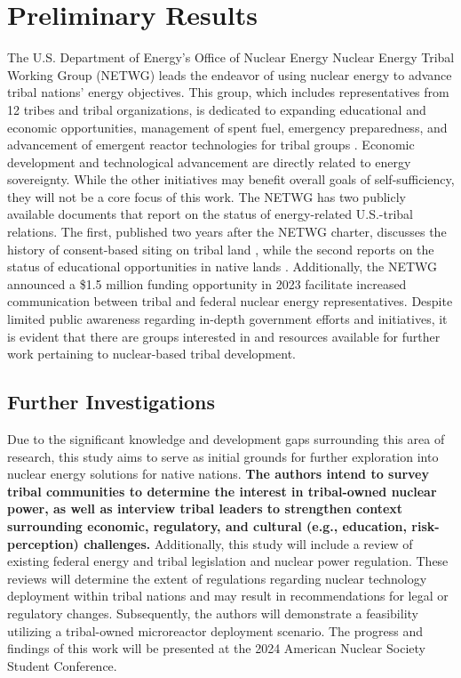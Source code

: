 \documentclass{anstrans}
\begin{document}
\section{Preliminary Results}
The U.S. Department of Energy's Office of Nuclear Energy Nuclear Energy Tribal
Working Group (NETWG) leads the endeavor of using nuclear energy to advance
tribal nations' energy objectives. This group, which includes representatives
from 12 tribes and tribal organizations, is dedicated to expanding educational
and economic opportunities, management of spent fuel, emergency preparedness,
and advancement of emergent reactor technologies for tribal groups
\cite{department_of_energy_nuclear_2023}. Economic development and technological
advancement are directly related to energy sovereignty. While the other
initiatives may benefit overall goals of self-sufficiency, they will not be a
core focus of this work. The NETWG has two publicly available documents that
report on the status of energy-related U.S.-tribal relations. The first,
published two years after the NETWG charter, discusses the history of
consent-based siting on tribal land
\cite{nuclear_energy_tribal_working_group_2016}, while the second reports on the
status of educational opportunities in native lands
\cite{nuclear_energy_tribal_working_group_2016}. Additionally, the NETWG
announced a \$1.5 million funding opportunity in 2023 facilitate increased
communication between tribal and federal nuclear energy representatives. Despite
limited public awareness regarding in-depth government efforts and initiatives,
it is evident that there are groups interested in and resources available for
further work pertaining to nuclear-based tribal development.

\subsection{Further Investigations}
Due to the significant knowledge and development gaps surrounding this area of
research, this study aims to serve as initial grounds for further exploration
into nuclear energy solutions for native nations. \textbf{The authors intend to
survey tribal communities to determine the interest in tribal-owned nuclear
power, as well as interview tribal leaders to strengthen context surrounding
economic, regulatory, and cultural (e.g., education, risk-perception)
challenges.} Additionally, this study will include a review of existing federal
energy and tribal legislation and nuclear power regulation. These reviews will
determine the extent of regulations regarding nuclear technology deployment
within tribal nations and may result in recommendations for legal or regulatory
changes. Subsequently, the authors will demonstrate a feasibility utilizing a
tribal-owned microreactor deployment scenario. The progress and findings of this
work will be presented at the 2024 American Nuclear Society Student Conference.
\end{document}
